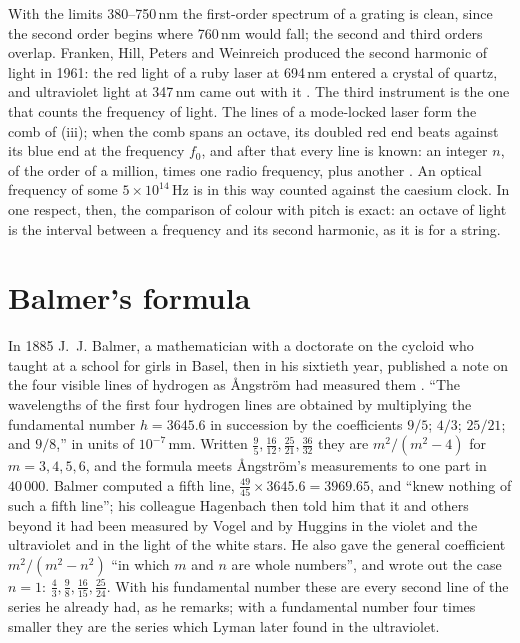 \documentclass[11pt]{article}
\begin{document}
\physical
With the limits 380--750\,nm the first-order spectrum of a grating is clean, since the second order begins where 760\,nm would fall; the second and third orders overlap.
Franken, Hill, Peters and Weinreich produced the second harmonic of light in 1961: the red light of a ruby laser at 694\,nm entered a crystal of quartz, and ultraviolet light at 347\,nm came out with it \cite{Franken}.
The third instrument is the one that counts the frequency of light.
The lines of a mode-locked laser form the comb of (iii); when the comb spans an octave, its doubled red end beats against its blue end at the frequency $f_0$, and after that every line is known: an integer $n$, of the order of a million, times one radio frequency, plus another \cite{Jones, Holzwarth, Hansch}.
An optical frequency of some $5\times10^{14}$\,Hz is in this way counted against the caesium clock.
In one respect, then, the comparison of colour with pitch is exact: an octave of light is the interval between a frequency and its second harmonic, as it is for a string.

\section{Balmer's formula}

In 1885 J.~J. Balmer, a mathematician with a doctorate on the cycloid who taught at a school for girls in Basel, then in his sixtieth year, published a note on the four visible lines of hydrogen as {\AA}ngstr\"om had measured them \cite{Balmer}.
``The wavelengths of the first four hydrogen lines are obtained by multiplying the fundamental number $h = 3645.6$ in succession by the coefficients $9/5$; $4/3$; $25/21$; and $9/8$,'' in units of $10^{-7}$\,mm.
Written $\tfrac95, \tfrac{16}{12}, \tfrac{25}{21}, \tfrac{36}{32}$ they are $m^2/(m^2-4)$ for $m = 3,4,5,6$, and the formula meets {\AA}ngstr\"om's measurements to one part in $40\,000$.
Balmer computed a fifth line, $\tfrac{49}{45}\times3645.6 = 3969.65$, and ``knew nothing of such a fifth line''; his colleague Hagenbach then told him that it and others beyond it had been measured by Vogel and by Huggins in the violet and the ultraviolet and in the light of the white stars.
He also gave the general coefficient $m^2/(m^2-n^2)$ ``in which $m$ and $n$ are whole numbers'', and wrote out the case $n=1$: $\tfrac43, \tfrac98, \tfrac{16}{15}, \tfrac{25}{24}$.
With his fundamental number these are every second line of the series he already had, as he remarks; with a fundamental number four times smaller they are the series which Lyman later found in the ultraviolet.
\end{document}
